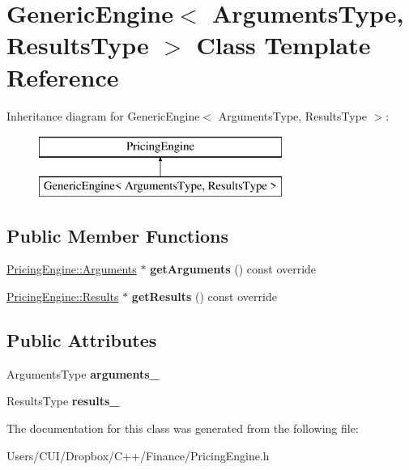 \hypertarget{class_generic_engine}{}\section{Generic\+Engine$<$ Arguments\+Type, Results\+Type $>$ Class Template Reference}
\label{class_generic_engine}
Inheritance diagram for Generic\+Engine$<$ Arguments\+Type, Results\+Type $>$\+:\begin{figure}[H]
\begin{center}
\leavevmode
\includegraphics[height=2.000000cm]{class_generic_engine}
\end{center}
\end{figure}
\subsection*{Public Member Functions}
\begin{DoxyCompactItemize}
\item 
\hypertarget{class_generic_engine_ac2adcbbc8d7b554e2cc1f90e4c4d055d}{}\label{class_generic_engine_ac2adcbbc8d7b554e2cc1f90e4c4d055d} 
\hyperlink{class_pricing_engine_1_1_arguments}{Pricing\+Engine\+::\+Arguments} $\ast$ {\bfseries get\+Arguments} () const override
\item 
\hypertarget{class_generic_engine_a2b8d7fba7e51c0795ea9f1e9c2f54afd}{}\label{class_generic_engine_a2b8d7fba7e51c0795ea9f1e9c2f54afd} 
\hyperlink{class_pricing_engine_1_1_results}{Pricing\+Engine\+::\+Results} $\ast$ {\bfseries get\+Results} () const override
\end{DoxyCompactItemize}
\subsection*{Public Attributes}
\begin{DoxyCompactItemize}
\item 
\hypertarget{class_generic_engine_a9ac595191e5d6976c65659d26063bfc8}{}\label{class_generic_engine_a9ac595191e5d6976c65659d26063bfc8} 
Arguments\+Type {\bfseries arguments\+\_\+}
\item 
\hypertarget{class_generic_engine_acd6af7c4b3fd0e43826755ba7d347dd5}{}\label{class_generic_engine_acd6af7c4b3fd0e43826755ba7d347dd5} 
Results\+Type {\bfseries results\+\_\+}
\end{DoxyCompactItemize}


The documentation for this class was generated from the following file\+:\begin{DoxyCompactItemize}
\item 
Users/\+C\+U\+I/\+Dropbox/\+C++/\+Finance/Pricing\+Engine.\+h\end{DoxyCompactItemize}
